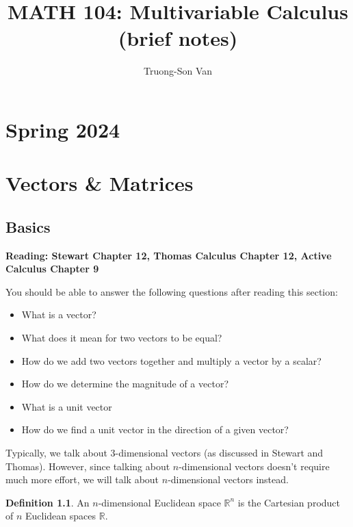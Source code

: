 \documentclass[
]{book}
\title{MATH 104: Multivariable Calculus (brief notes)}
\author{Truong-Son Van}
\date{}
\theoremstyle{definition}
\newtheorem{definition}{Definition}[chapter]
\theoremstyle{definition}
\theoremstyle{definition}
\theoremstyle{definition}
\theoremstyle{remark}
\begin{document}
\maketitle

{
\setcounter{tocdepth}{2}
\tableofcontents
}
\chapter*{Spring 2024}\label{spring-2024}

\newpage

\newcommand{\vectorproj}[2][]{\mathrm{proj}_{\vect{#1}}\vect{#2}}
\newcommand{\vectorcomp}[2][]{\mathrm{comp}_{\vect{#1}}\vect{#2}}
\newcommand{\vect}{\mathbf}
\newcommand{\R}{\mathbb{R}}

\chapter{Vectors \& Matrices}\label{vectors-matrices}

\section{Basics}\label{basics}

\textbf{Reading: Stewart Chapter 12, Thomas Calculus Chapter 12,
Active Calculus Chapter 9}

You should be able to answer the following questions after reading this section:

\begin{itemize}
\item
  What is a vector?
\item
  What does it mean for two vectors to be equal?
\item
  How do we add two vectors together and multiply a vector by a scalar?
\item
  How do we determine the magnitude of a vector?
\item
  What is a unit vector
\item
  How do we find a unit vector in the direction of a given vector?
\end{itemize}

Typically, we talk about 3-dimensional vectors (as discussed in Stewart and Thomas).
However, since talking about \(n\)-dimensional vectors doesn't
require much more effort,
we will talk about \(n\)-dimensional vectors instead.

\begin{definition}
An \(n\)-dimensional Euclidean space \(\mathbb{R}^n\)
is the Cartesian product of \(n\) Euclidean spaces \(\mathbb{R}\).
\end{definition}
\end{document}
